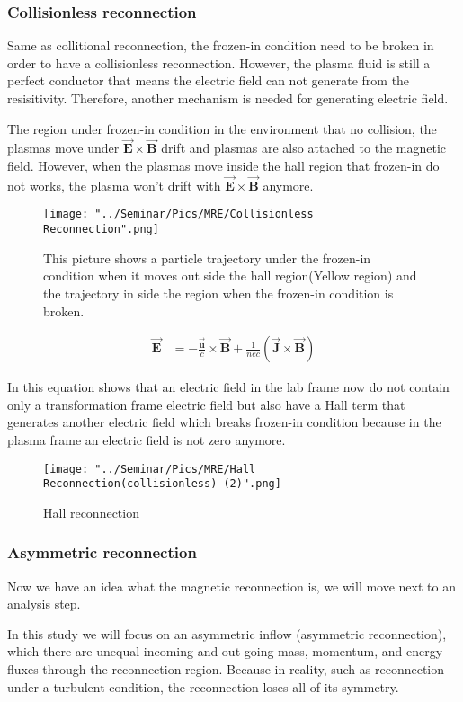 \documentclass[12pt, a4paper]{article}
\begin{document}
		\subsubsection*{Collisionless reconnection}
		Same as collitional reconnection, the frozen-in condition need to be broken in order to have a collisionless reconnection. However, the plasma fluid is still a perfect conductor that means the electric field can not generate from the resisitivity. Therefore, another mechanism is needed for generating electric field.\par
	The region under frozen-in condition in the environment that no collision, the plasmas move under $\vec{\mathbf{E}}\times\vec{\mathbf{B}}$ drift and plasmas are also attached to the magnetic field. However, when the plasmas move inside the hall region that frozen-in do not works, the plasma won't drift with $\vec{\mathbf{E}}\times\vec{\mathbf{B}}$ anymore.\par
		\begin{figure}[hbtp]
		\centering
		\texttt{[image: "../Seminar/Pics/MRE/Collisionless Reconnection".png]}
		\caption{This picture shows a particle trajectory under the frozen-in condition when it moves out side the hall region(Yellow region) and the trajectory in side the region when the frozen-in condition is broken.}
		\end{figure}
		\begin{align*}
			\vec{\mathbf{E}}&=-\frac{\vec{\mathbf{u}}}{c}\times\vec{\mathbf{B}}+\frac{1}{nec}\left(\vec{\mathbf{J}}\times\vec{\mathbf{B}}\right)
		\end{align*}\par
		In this equation shows that an electric field in the lab frame now do not contain only a transformation frame electric field but also have a Hall term that generates another electric field which  breaks frozen-in condition because in the plasma frame an electric field is not zero anymore.\par
		\begin{figure}[hbtp]
		\centering
		\texttt{[image: "../Seminar/Pics/MRE/Hall Reconnection(collisionless) (2)".png]}
		\caption{Hall reconnection}
		\end{figure}		
		
		\newpage
		
		
			
		
		
	\subsubsection*{Asymmetric reconnection}
		Now we have an idea what the magnetic reconnection is, we will move next to an analysis step.\par In this study we will focus on an asymmetric inflow (asymmetric reconnection), which there are unequal incoming and out going mass, momentum, and energy fluxes through the reconnection region. Because in reality, such as reconnection under a turbulent condition, the reconnection loses all of its symmetry. 
	
\end{document}
